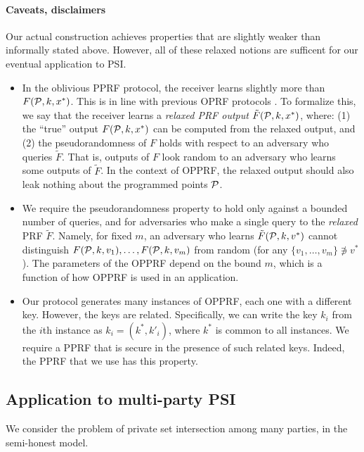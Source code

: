 \paragraph{Caveats, disclaimers}
Our actual construction achieves properties that are slightly weaker than informally stated above. However, all of these relaxed notions are sufficent for our eventual application to PSI.
\begin{itemize}

    \item In the oblivious PPRF protocol, the receiver learns slightly more than $F(\P,k,x^*)$. This is in line with previous OPRF protocols \cite{xx,xx}. To formalize this, we say that the receiver learns a {\em relaxed PRF output} $\tilde F(\P,k,x^*)$, where: (1) the ``true'' output $F(\P,k,x^*)$ can be computed from the relaxed output, and (2) the pseudorandomness of $F$ holds with respect to an adversary who queries $\tilde F$. That is, outputs of $F$ look random to an adversary who learns some outputs of $\tilde F$. In the context of OPPRF, the relaxed output should also leak nothing about the programmed points $\P$.

    \item We require the pseudorandomness property to hold only against a bounded number of queries, and for adversaries who make a single query to the {\em relaxed} PRF $\tilde F$. Namely, for fixed $m$, an adversary who learns $\tilde F(\P,k,v^*)$ cannot distinguish $F(\P,k,v_1), \ldots, F(\P,k,v_m)$ from random (for any $\{ v_1, \ldots, v_m \} \not\ni v^*$). The parameters of the OPPRF depend on the bound $m$, which is a function of how OPPRF is used in an application.

    \item Our protocol generates many instances of OPPRF, each one with a different key. However, the keys are related. Specifically, we can write the key $k_i$ from the $i$th instance as $k_i = (k^*, k'_i)$, where $k^*$ is common to all instances. We require a PPRF that is secure in the presence of such related keys. Indeed, the PPRF that we use has this property.

\end{itemize}



\subsection{Application to multi-party PSI}

We consider the problem of private set intersection among many parties, in the semi-honest model.

